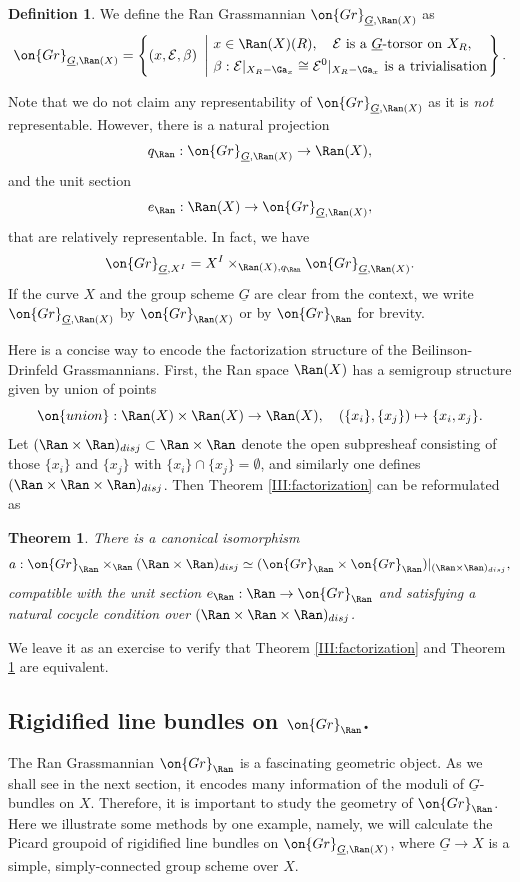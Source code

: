 \documentclass[]{pcmi}
\theoremstyle{plain}
\newtheorem{thm}[equation]{Theorem}
\theoremstyle{remark}
\theoremstyle{definition}
\newtheorem{dfn}[equation]{Definition}
\newcommand{\mE}{{\mathcal E}}
\newcommand{\Gr}{{\on{Gr}}}
\begin{document}
\begin{dfn}\label{dfn Ran Grass}
We define the Ran Grassmannian $\Gr_{\underline G,\Ran(X)}$ as
\[\Gr_{\underline G,\Ran(X)}=\left\{(x,\mE,\beta)\ \left|\ \begin{split}&x\in \Ran(X)(R),\quad \mE \mbox{ is a } \underline{G}\mbox{-torsor on } X_R, \\
& \beta: \mE|_{X_R-\Ga_x}\cong \mE^0|_{X_R-\Ga_x} \mbox{ is a trivialisation}\end{split}\right.\right\}.\]
\end{dfn}
Note that we do not claim any representability of $\Gr_{\underline G,\Ran(X)}$ as it is \emph{not} representable. However, 
there is a natural projection
\[q_{\Ran}: \Gr_{\underline G,\Ran(X)}\to \Ran(X),\]
and the unit section
\[e_{\Ran}:\Ran(X)\to  \Gr_{\underline G,\Ran(X)},\]
that are relatively representable.
In fact, we have
\[\Gr_{\underline G,X^I}=X^I\times_{\Ran(X),q_{\Ran}}\Gr_{\underline G,\Ran(X)}.\]
If the curve $X$ and the group scheme $\underline G$ are clear from the context, we write $\Gr_{\underline G,\Ran(X)}$ by $\Gr_{\Ran(X)}$ or by $\Gr_{\Ran}$ for brevity.

Here is a concise way to encode the factorization structure of the Beilinson-Drinfeld Grassmannians. First, the Ran space $\Ran(X)$ has a semigroup structure given by union of points
\[\on{union}: \Ran(X)\times \Ran(X)\to \Ran(X),\quad (\{x_i\},\{x_j\})\mapsto \{x_i,x_j\}.\]
Let $(\Ran\times \Ran)_{disj}\subset \Ran\times\Ran$ denote the open subpresheaf consisting of those $\{x_i\}$ and $\{x_j\}$ with $\{x_i\}\cap \{x_j\}=\emptyset$, and similarly one defines $(\Ran\times \Ran\times \Ran)_{disj}$. Then Theorem \ref{III:factorization} can be reformulated as
\begin{thm}\label{Ran Grass factorization}
There is a canonical isomorphism
\[a: \Gr_{\Ran}\times_{\Ran}(\Ran\times\Ran)_{disj}\simeq (\Gr_{\Ran}\times\Gr_{\Ran})|_{(\Ran\times\Ran)_{disj}},\]
compatible with the unit section $e_{\Ran}:\Ran\to\Gr_{\Ran}$ and satisfying a natural cocycle condition over $(\Ran\times\Ran\times \Ran)_{disj}$. 
\end{thm}
We leave it as an exercise to verify that Theorem \ref{III:factorization} and Theorem \ref{Ran Grass factorization} are equivalent.





\subsection{Rigidified line bundles on $\Gr_{\Ran}$.}\label{line bundle on BD Grass}
The Ran Grassmannian $\Gr_{\Ran}$ is a fascinating geometric object. As we shall see in the next section, it encodes many information of the moduli of $\underline G$-bundles on $X$. Therefore, it is important to study the geometry of $\Gr_{\Ran}$.
Here we illustrate some methods by one example, namely, we will calculate the Picard groupoid of rigidified line bundles on $\Gr_{\underline{G}, \Ran(X)}$, where $\underline{G}\to X$ is a simple, simply-connected group scheme over $X$. 
\end{document}
